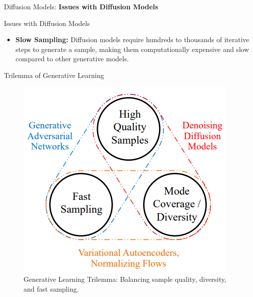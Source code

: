 \begin{frame}{}
    \LARGE Diffusion Models: \textbf{Issues with Diffusion Models}
\end{frame}


\begin{frame}{Issues with Diffusion Models}
\begin{itemize}
    \item \textbf{Slow Sampling:} Diffusion models require hundreds to thousands of iterative steps to generate a sample, making them computationally expensive and slow compared to other generative models.
\end{itemize}
\end{frame}

\begin{frame}{Trilemma of Generative Learning}
    \begin{figure}
        \centering
        \includegraphics[height=0.8\textheight, width=\textwidth, keepaspectratio]{images/diffusion/trilemma.png}
        \caption*{Generative Learning Trilemma: Balancing sample quality, diversity, and fast sampling.}
    \end{figure}
\end{frame}

